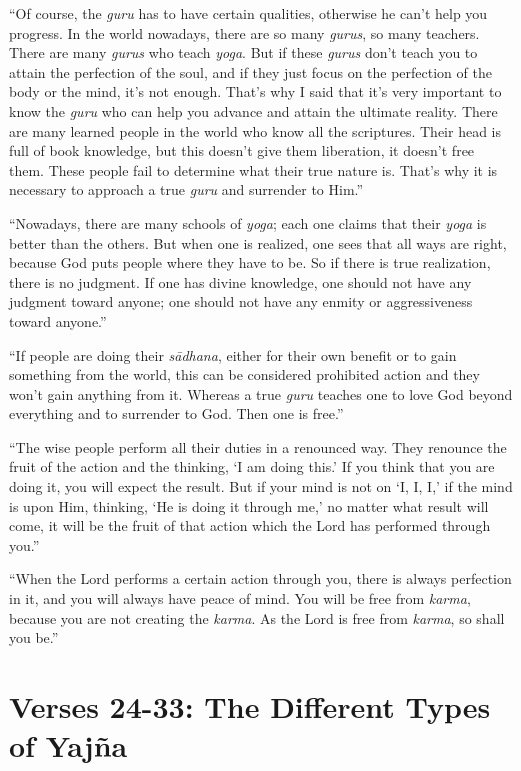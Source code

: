 \enquote{Of course, the \textit{guru} has to have certain qualities, otherwise he can’t help you progress. In the world nowadays, there are so many \textit{gurus}, so many teachers. There are many \textit{gurus} who teach \textit{yoga}. But if these \textit{gurus} don’t teach you to attain the perfection of the soul, and if they just focus on the perfection of the body or the mind, it’s not enough. That’s why I said that it’s very important to know the \textit{guru} who can help you advance and attain the ultimate reality. There are many learned people in the world who know all the scriptures. Their head is full of book knowledge, but this doesn’t give them liberation, it doesn’t free them. These people fail to determine what their true nature is. That’s why it is necessary to approach a true \textit{guru} and surrender to Him.}

\enquote{Nowadays, there are many schools of \textit{yoga}; each one claims that their \textit{yoga} is better than the others. But when one is realized, one sees that all ways are right, because God puts people where they have to be. So if there is true realization, there is no judgment. If one has divine knowledge, one should not have any judgment toward anyone; one should not have any enmity or aggressiveness toward anyone.}

\enquote{If people are doing their \textit{sādhana}, either for their own benefit or to gain something from the world, this can be considered prohibited action and they won’t gain anything from it. Whereas a true \textit{guru} teaches one to love God beyond everything and to surrender to God. Then one is free.}

\enquote{The wise people perform all their duties in a renounced way. They renounce the fruit of the action and the thinking, \enquote{I am doing this.} If you think that you are doing it, you will expect the result. But if your mind is not on \enquote{I, I, I,} if the mind is upon Him, thinking, \enquote{He is doing it through me,} no matter what result will come, it will be the fruit of that action which the Lord has performed through you.}

\enquote{When the Lord performs a certain action through you, there is always perfection in it, and you will always have peace of mind. You will be free from \textit{karma}, because you are not creating the \textit{karma}. As the Lord is free from \textit{karma}, so shall you be.}

\newpage
\section{Verses 24-33: The Different Types of Yajña}\label{sec-verses-24-33-the-different-types-of-yajna}


